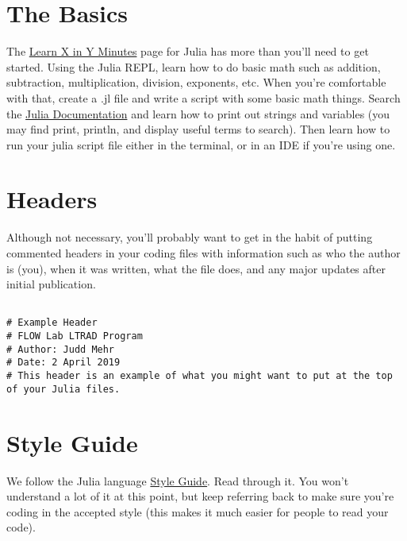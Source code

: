 \documentclass{article}%
\begin{document}
\section{The Basics}
The \href{https://learnxinyminutes.com/docs/julia/}{Learn X in Y Minutes} page for Julia has more than you'll need to get started.  Using the Julia REPL, learn how to do basic math such as addition, subtraction, multiplication, division, exponents, etc.  When you're comfortable with that, create a .jl file and write a script with some basic math things. Search the \href{https://docs.julialang.org/en/v1/index.html}{Julia Documentation} and learn how to print out strings and variables (you may find print, println, and display useful terms to search). Then learn how to run your julia script file either in the terminal, or in an IDE if you're using one.


\section{Headers}
Although not necessary, you'll probably want to get in the habit of putting commented headers in your coding files with information such as who the author is (you), when it was written, what the file does, and any major updates after initial publication.

\begin{lstlisting}[frame=single]

# Example Header
# FLOW Lab LTRAD Program
# Author: Judd Mehr
# Date: 2 April 2019
# This header is an example of what you might want to put at the top of your Julia files.
\end{lstlisting}


\section{Style Guide}
We follow the Julia language \href{https://docs.julialang.org/en/v1/manual/style-guide/index.html}{Style Guide}. Read through it. You won't understand a lot of it at this point, but keep referring back to make sure you're coding in the accepted style (this makes it much easier for people to read your code).
\end{document}
